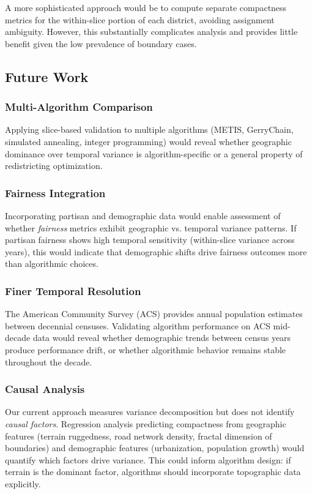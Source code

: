 A more sophisticated approach would be to compute separate compactness metrics for the within-slice portion of each district, avoiding assignment ambiguity. However, this substantially complicates analysis and provides little benefit given the low prevalence of boundary cases.

\subsection{Future Work}

\subsubsection{Multi-Algorithm Comparison}

Applying slice-based validation to multiple algorithms (METIS, GerryChain, simulated annealing, integer programming) would reveal whether geographic dominance over temporal variance is algorithm-specific or a general property of redistricting optimization.

\subsubsection{Fairness Integration}

Incorporating partisan and demographic data would enable assessment of whether \textit{fairness} metrics exhibit geographic vs. temporal variance patterns. If partisan fairness shows high temporal sensitivity (within-slice variance across years), this would indicate that demographic shifts drive fairness outcomes more than algorithmic choices.

\subsubsection{Finer Temporal Resolution}

The American Community Survey (ACS) provides annual population estimates between decennial censuses. Validating algorithm performance on ACS mid-decade data would reveal whether demographic trends between census years produce performance drift, or whether algorithmic behavior remains stable throughout the decade.

\subsubsection{Causal Analysis}

Our current approach measures variance decomposition but does not identify \textit{causal factors}. Regression analysis predicting compactness from geographic features (terrain ruggedness, road network density, fractal dimension of boundaries) and demographic features (urbanization, population growth) would quantify which factors drive variance. This could inform algorithm design: if terrain is the dominant factor, algorithms should incorporate topographic data explicitly.

